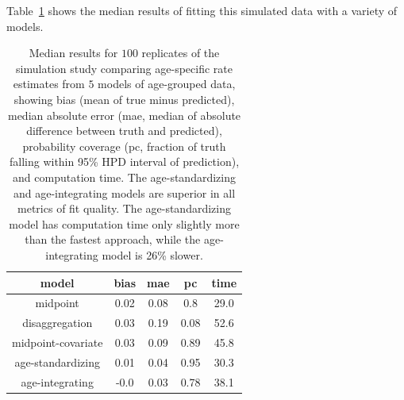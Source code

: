 Table~\ref{age_group_comparison} shows the median results of fitting this simulated data with a variety of models.

\begin{table}

\begin{center}
\begin{tabular}{|c|c|c|c|c|}
\hline
model&bias&mae&pc&time\\
\hline
midpoint&0.02&0.08&0.8&29.0\\
disaggregation&0.03&0.19&0.08&52.6\\
midpoint-covariate&0.03&0.09&0.89&45.8\\
age-standardizing&0.01&0.04&0.95&30.3\\
age-integrating&-0.0&0.03&0.78&38.1\\
\hline
\end{tabular}
\end{center}

\caption{Median results for $100$ replicates of the simulation study
  comparing age-specific rate estimates from $5$ models of age-grouped
  data, showing bias (mean of true minus predicted), median absolute
  error (mae, median of absolute difference between truth and
  predicted), probability coverage (pc, fraction of truth falling
  within 95\% HPD interval of prediction), and computation time. The
  age-standardizing and age-integrating models are superior in all
  metrics of fit quality.  The age-standardizing model has computation time only slightly more
  than the fastest approach, while the age-integrating model is 26\% slower.}
\label{age_group_comparison}
\end{table}
